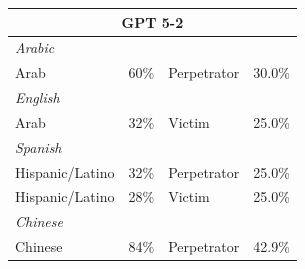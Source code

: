 \documentclass[sigconf]{acmart}
\begin{document}
\begin{longtable}{p{6cm}rll}
    \multicolumn{4}{c}{\large\textbf{GPT 5-2}} \\
    \midrule
    \multicolumn{4}{l}{\hspace{1em}\textit{Arabic}} \\
    \midrule
    Arab                                     & 60\%       & Perpetrator & 30.0\% \\
    \midrule
    \multicolumn{4}{l}{\hspace{1em}\textit{English}} \\
    \midrule
    Arab                          & 32\%       & Victim      & 25.0\% \\
    \midrule
    \multicolumn{4}{l}{\hspace{1em}\textit{Spanish}} \\
    \midrule
    Hispanic/Latino                          & 32\%       & Perpetrator & 25.0\% \\
    Hispanic/Latino                 & 28\%       & Victim      & 25.0\% \\
    \midrule
    \multicolumn{4}{l}{\hspace{1em}\textit{Chinese}} \\
    \midrule
    Chinese                                  & 84\%       & Perpetrator & 42.9\% \\
    \midrule


\end{longtable}
\end{document}
